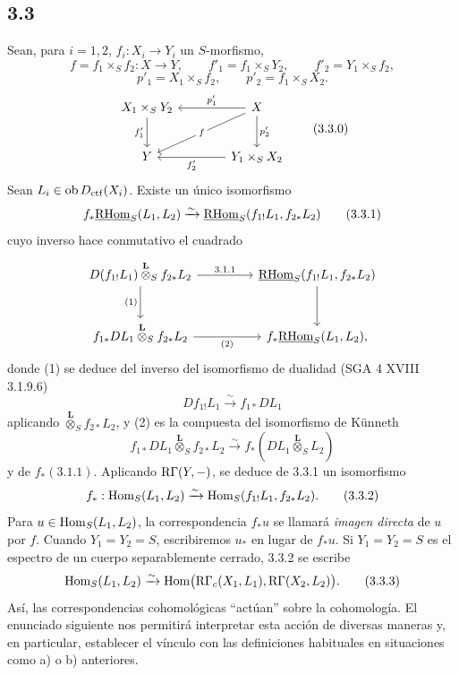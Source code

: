 \subsection*{3.3}
Sean, para $i=1,2$, $f_i:X_i\to Y_i$ un $S$-morfismo,
\[
f=f_1\times_S f_2:X\to Y,
\qquad
f'_1=f_1\times_S Y_2,
\qquad
f'_2=Y_1\times_S f_2,
\]
\[
p'_1=X_1\times_S f_2,
\qquad
p'_2=f_1\times_S X_2.
\]
\begin{equation}
\begin{tikzcd}[column sep=3.8em,row sep=2.4em]
X_1\times_S Y_2 \arrow[d,"f'_1"'] & X \arrow[l,"p'_1"'] \arrow[dl,"f" description] \arrow[d,"p'_2"] \\
Y & Y_1\times_S X_2 \arrow[l,"f'_2"]
\end{tikzcd}
\tag{3.3.0}
\end{equation}
Sean $L_i\in\operatorname{ob}D_{\mathrm{ctf}}(X_i)$. Existe un único isomorfismo
\begin{equation}
f_*\underline{\mathrm{RHom}}_S(L_1,L_2)
\xrightarrow{\sim}
\underline{\mathrm{RHom}}_S(f_{1!}L_1,f_{2*}L_2)
\tag{3.3.1}
\end{equation}
cuyo inverso hace conmutativo el cuadrado
\[
\begin{tikzcd}[column sep=4.5em,row sep=2.6em]
D(f_{1!}L_1)\overset{\mathbf L}{\otimes}_S f_{2*}L_2
  \arrow[r,"3.1.1"] \arrow[d,"(1)"']
& \uRHom_S(f_{1!}L_1,f_{2*}L_2) \arrow[d] \\
f_{1*}DL_1\overset{\mathbf L}{\otimes}_S f_{2*}L_2
  \arrow[r,"(2)"']
& f_*\uRHom_S(L_1,L_2),
\end{tikzcd}
\]
donde (1) se deduce del inverso del isomorfismo de dualidad (SGA 4 XVIII 3.1.9.6)
\[
Df_{1!}L_1\xrightarrow{\sim}f_{1*}DL_1
\]
aplicando $\overset{\mathbf L}{\otimes}_S f_{2*}L_2$, y (2) es la compuesta del isomorfismo de Künneth
\[
f_{1*}DL_1\overset{\mathbf L}{\otimes}_S f_{2*}L_2
\xrightarrow{\sim}
f_*(DL_1\overset{\mathbf L}{\otimes}_S L_2)
\]
y de $f_*(3.1.1)$. Aplicando $\mathrm{R}\Gamma(Y,-)$, se deduce de 3.3.1 un isomorfismo
\begin{equation}
f_*:\operatorname{Hom}_S(L_1,L_2)
\xrightarrow{\sim}
\operatorname{Hom}_S(f_{1!}L_1,f_{2*}L_2).
\tag{3.3.2}
\end{equation}
Para $u\in\operatorname{Hom}_S(L_1,L_2)$, la correspondencia $f_*u$ se llamará \emph{imagen directa} de $u$ por $f$. Cuando $Y_1=Y_2=S$, escribiremos $u_*$ en lugar de $f_*u$. Si $Y_1=Y_2=S$ es el espectro de un cuerpo separablemente cerrado, 3.3.2 se escribe
\begin{equation}
\operatorname{Hom}_S(L_1,L_2)
\xrightarrow{\sim}
\operatorname{Hom}\bigl(\mathrm{R}\Gamma_c(X_1,L_1),\mathrm{R}\Gamma(X_2,L_2)\bigr).
\tag{3.3.3}
\end{equation}
Así, las correspondencias cohomológicas ``actúan'' sobre la cohomología. El enunciado siguiente nos permitirá interpretar esta acción de diversas maneras y, en particular, establecer el vínculo con las definiciones habituales en situaciones como a) o b) anteriores.

